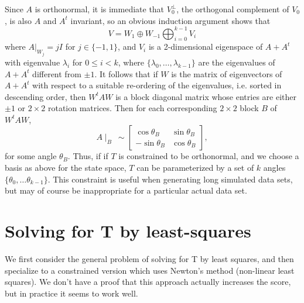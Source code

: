 \documentclass[12pt,leqno]{article}
\begin{document}
Since $A$ is orthonormal, it is immediate that $V_0^{\perp}$,
the orthogonal complement of $V_0$, is also $A$ and $A^t$ invariant, so an obvious induction argument shows that
$$
V = W_1\oplus W_{-1} \bigoplus_{i=0}^{k-1} V_i
$$
where $A|_{W_j} = jI$ for $j \in \{-1,1\}$, and $V_i$ is a 2-dimensional eigenspace of $A+A^t$ with eigenvalue $\lambda_i$
for $0\le i < k$, where $\{\lambda_0,\dots,\lambda_{k-1}\}$ are the eigenvalues of $A+A^t$ different
from $\pm 1$.  It follows that if $W$ is the matrix of eigenvectors of $A+A^t$ with respect to a suitable
re-ordering of the eigenvalues, i.e. sorted in descending order, then $W^tAW$ is a block diagonal matrix
whose entries are either $\pm 1$ or $2\times 2$ rotation matrices.  Then for each corresponding $2\times 2$
block $B$ of $W^tAW$,
$$
A\mid_B ~\sim \left[\begin{matrix}
    \cos\theta_B & \sin\theta_B \\
    -\sin\theta_B & \cos\theta_B
  \end{matrix}\right],
$$
for some angle $\theta_B$.  Thus, if if $T$ is constrained to be orthonormal, and we choose a basis as above
for the state space, $T$ can be  parameterized by a set of $k$ angles $\{\theta_0,\dots\theta_{k-1}\}$.  This
constraint is useful when generating long simulated data sets,  but may of course be inappropriate for a particular
actual data set.


\section{Solving for T by least-squares}\label{least_squares}
We first consider the general problem of solving for T by least squares, and then specialize to a constrained
version which uses Newton's method (non-linear least squares).  We don't have a proof that this approach actually
increases the score, but in practice it seems to work well.
\end{document}
